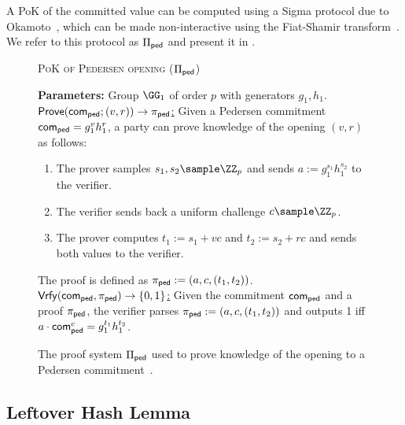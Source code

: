 A PoK of the committed value can be computed using a Sigma protocol due to Okamoto~\cite{C:Okamoto92}, which can be made non-interactive using the Fiat-Shamir transform~\cite{C:FiaSha86}. We refer to this protocol as $\Pi_{\sf ped}$ and present it in .

\begin{figure*}[tbh]
   \centering
   \begin{mdframed}
   \begin{center}
       \textsc{PoK of Pedersen opening ($\Pi_{\sf ped}$)}
   \end{center}
   \medskip
   \textbf{Parameters:} Group $\GG_1$ of order $p$ with generators $g_1, h_1$.
   \hfill\medskip\\
   \underline{$\mathsf{Prove}(\mathsf{com}_{\sf ped}; (v, r)) \to \pi_{\sf ped}$:} Given a Pedersen commitment $\mathsf{com}_{\sf ped} = g_1^v h_1^r$, a party can prove knowledge of the opening $(v,r)$ as follows:
   \begin{enumerate}
       \item The prover samples $s_1, s_2 \sample \ZZ_p$ and sends $a := g_1^{s_1} h_1^{s_2}$ to the verifier.
       \item The verifier sends back a uniform challenge $c \sample \ZZ_p$.
       \item The prover computes $t_1 := s_1 + vc$ and $t_2 := s_2 + rc$ and sends both values to the verifier.
   \end{enumerate}
   The proof is defined as $\pi_{\sf ped} := (a, c, (t_1, t_2))$.\medskip\\
   \underline{$\mathsf{Vrfy}(\mathsf{com}_{\sf ped}, \pi_{\sf ped}) \to \{0,1\}$:} Given the commitment $\mathsf{com}_{\sf ped}$ and a proof $\pi_{\sf ped}$, the verifier parses $\pi_{\sf ped} := (a, c, (t_1, t_2))$ and outputs 1 iff $a \cdot \mathsf{com}_{\sf ped}^c = g_1^{t_1} h_1^{t_2}$.
   \end{mdframed}
   \caption{The proof system $\Pi_{\sf ped}$ used to prove knowledge of the opening to a Pedersen commitment~\cite{C:Okamoto92}.}
   \label{fig:pi_ped}
\end{figure*}

\subsection{Leftover Hash Lemma}\label{sec:lhl}  

